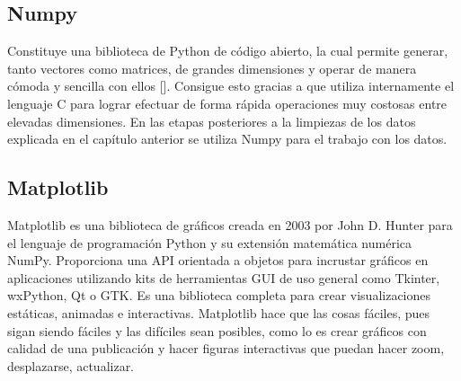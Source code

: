 \subsection{Numpy}
Constituye una biblioteca de Python de código abierto, la cual permite generar, tanto vectores como matrices, de grandes dimensiones y operar de manera cómoda y sencilla con ellos [\cite{numpy_2012}].
Consigue esto gracias a que utiliza internamente el lenguaje C para lograr efectuar de forma rápida operaciones muy costosas entre elevadas dimensiones.
En las etapas posteriores a la limpiezas de los datos explicada en el capítulo anterior se utiliza Numpy para el trabajo con los datos.

\subsection{Matplotlib}
Matplotlib es una biblioteca de gráficos creada en 2003 por John D. Hunter para el lenguaje de programación Python y su extensión matemática numérica NumPy. Proporciona una API orientada a objetos para incrustar gráficos en aplicaciones utilizando kits de herramientas GUI de uso general como Tkinter, wxPython, Qt o GTK.
Es una biblioteca completa para crear visualizaciones estáticas, animadas e interactivas. Matplotlib hace que las cosas fáciles, pues sigan siendo fáciles y las difíciles sean posibles, como lo es crear gráficos con calidad de una publicación y hacer figuras interactivas que puedan hacer zoom, desplazarse, actualizar.

%
%
%

